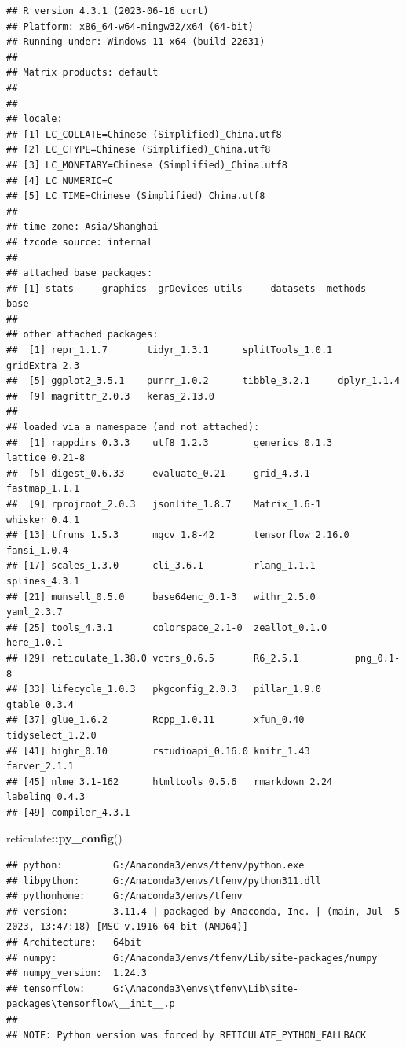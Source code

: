 \documentclass[
]{article}
\newenvironment{Shaded}{\begin{snugshade}}{\end{snugshade}}
\newcommand{\FunctionTok}[1]{\textcolor[rgb]{0.13,0.29,0.53}{\textbf{#1}}}
\newcommand{\NormalTok}[1]{#1}
\newcommand{\SpecialCharTok}[1]{\textcolor[rgb]{0.81,0.36,0.00}{\textbf{#1}}}
\begin{document}
\begin{verbatim}
## R version 4.3.1 (2023-06-16 ucrt)
## Platform: x86_64-w64-mingw32/x64 (64-bit)
## Running under: Windows 11 x64 (build 22631)
## 
## Matrix products: default
## 
## 
## locale:
## [1] LC_COLLATE=Chinese (Simplified)_China.utf8 
## [2] LC_CTYPE=Chinese (Simplified)_China.utf8   
## [3] LC_MONETARY=Chinese (Simplified)_China.utf8
## [4] LC_NUMERIC=C                               
## [5] LC_TIME=Chinese (Simplified)_China.utf8    
## 
## time zone: Asia/Shanghai
## tzcode source: internal
## 
## attached base packages:
## [1] stats     graphics  grDevices utils     datasets  methods   base     
## 
## other attached packages:
##  [1] repr_1.1.7       tidyr_1.3.1      splitTools_1.0.1 gridExtra_2.3   
##  [5] ggplot2_3.5.1    purrr_1.0.2      tibble_3.2.1     dplyr_1.1.4     
##  [9] magrittr_2.0.3   keras_2.13.0    
## 
## loaded via a namespace (and not attached):
##  [1] rappdirs_0.3.3    utf8_1.2.3        generics_0.1.3    lattice_0.21-8   
##  [5] digest_0.6.33     evaluate_0.21     grid_4.3.1        fastmap_1.1.1    
##  [9] rprojroot_2.0.3   jsonlite_1.8.7    Matrix_1.6-1      whisker_0.4.1    
## [13] tfruns_1.5.3      mgcv_1.8-42       tensorflow_2.16.0 fansi_1.0.4      
## [17] scales_1.3.0      cli_3.6.1         rlang_1.1.1       splines_4.3.1    
## [21] munsell_0.5.0     base64enc_0.1-3   withr_2.5.0       yaml_2.3.7       
## [25] tools_4.3.1       colorspace_2.1-0  zeallot_0.1.0     here_1.0.1       
## [29] reticulate_1.38.0 vctrs_0.6.5       R6_2.5.1          png_0.1-8        
## [33] lifecycle_1.0.3   pkgconfig_2.0.3   pillar_1.9.0      gtable_0.3.4     
## [37] glue_1.6.2        Rcpp_1.0.11       xfun_0.40         tidyselect_1.2.0 
## [41] highr_0.10        rstudioapi_0.16.0 knitr_1.43        farver_2.1.1     
## [45] nlme_3.1-162      htmltools_0.5.6   rmarkdown_2.24    labeling_0.4.3   
## [49] compiler_4.3.1
\end{verbatim}

\begin{Shaded}
\begin{Highlighting}[]
\NormalTok{reticulate}\SpecialCharTok{::}\FunctionTok{py\_config}\NormalTok{()}
\end{Highlighting}
\end{Shaded}

\begin{verbatim}
## python:         G:/Anaconda3/envs/tfenv/python.exe
## libpython:      G:/Anaconda3/envs/tfenv/python311.dll
## pythonhome:     G:/Anaconda3/envs/tfenv
## version:        3.11.4 | packaged by Anaconda, Inc. | (main, Jul  5 2023, 13:47:18) [MSC v.1916 64 bit (AMD64)]
## Architecture:   64bit
## numpy:          G:/Anaconda3/envs/tfenv/Lib/site-packages/numpy
## numpy_version:  1.24.3
## tensorflow:     G:\Anaconda3\envs\tfenv\Lib\site-packages\tensorflow\__init__.p
## 
## NOTE: Python version was forced by RETICULATE_PYTHON_FALLBACK
\end{verbatim}
\end{document}
